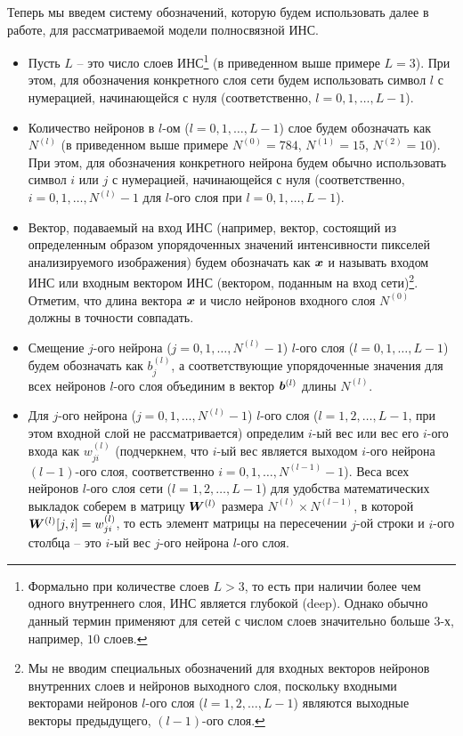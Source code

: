 \documentclass[a4paper,12pt,russian]{article} %
\begin{document}
Теперь мы введем систему обозначений, которую будем использовать далее в работе, для рассматриваемой модели полносвязной ИНС.

\begin{itemize}
	\item 
		Пусть $L$ -- это число слоев ИНС\footnote{
			Формально при количестве слоев $L>3$, то есть при наличии более чем одного внутреннего слоя, ИНС является глубокой (deep).
			Однако обычно данный термин применяют для сетей с числом слоев значительно больше $3$-х, например, $10$ слоев.
		}
		(в приведенном выше примере $L=3$).
		При этом, для обозначения конкретного слоя сети будем использовать символ $l$ с нумерацией, начинающейся с нуля (соответственно, $l=0, 1, \ldots, L-1$).
	\item 
		Количество нейронов в $l$-ом ($l=0, 1, \ldots, L-1$) слое  будем обозначать как $N^{(l)}$ (в приведенном выше примере $N^{(0)}=784$, $N^{(1)}=15$, $N^{(2)}=10$).
		При этом, для обозначения конкретного нейрона будем обычно использовать символ $i$ или $j$ с нумерацией, начинающейся с нуля (соответственно, $i=0, 1, \ldots, N^{(l)}-1$ для $l$-ого слоя при $l=0, 1, \ldots, L-1$).
	\item 
		Вектор, подаваемый на вход ИНС (например, вектор, состоящий из определенным образом упорядоченных значений интенсивности пикселей анализируемого изображения) будем обозначать как $\bm{x}$ и называть входом ИНС или входным вектором ИНС (вектором, поданным на вход сети)\footnote{
			Мы не вводим специальных обозначений для входных векторов нейронов внутренних слоев и нейронов выходного слоя, поскольку входными векторами нейронов $l$-ого слоя ($l=1, 2, \ldots, L-1$) являются выходные векторы предыдущего, $(l-1)$-ого слоя.
		}.
		Отметим, что длина вектора $\bm{x}$ и число нейронов входного слоя $N^{(0)}$ должны в точности совпадать.
	\item 
		Смещение $j$-ого нейрона  ($j=0, 1, \ldots, N^{(l)}-1$) $l$-ого слоя  ($l=0, 1, \ldots, L-1$) будем обозначать как $b_j^{(l)}$, а соответствующие упорядоченные значения для всех нейронов $l$-ого слоя объединим в вектор $\bm{b}^{(l)}$ длины $N^{(l)}$.
	\item 
		Для $j$-ого нейрона  ($j=0, 1, \ldots, N^{(l)}-1$) $l$-ого слоя ($l=1, 2, \ldots, L-1$, при этом входной слой не рассматривается) определим $i$-ый вес  или вес его $i$-ого входа как $w_{ji}^{(l)}$ (подчеркнем, что $i$-ый вес является выходом $i$-ого нейрона $(l-1)$-ого слоя, соответственно $i=0, 1, \ldots, N^{(l-1)}-1$).
		Веса всех нейронов $l$-ого слоя сети ($l=1, 2, \ldots, L-1$) для удобства математических выкладок соберем в матрицу $\bm{W}^{(l)}$ размера $N^{(l)} \times N^{(l-1)}$, в которой $\bm{W}^{(l)} [j, i] = w_{ji}^{(l)}$, то есть элемент матрицы на пересечении $j$-ой строки и $i$-ого столбца -- это $i$-ый вес $j$-ого нейрона $l$-ого слоя.

\end{itemize}
\end{document}
